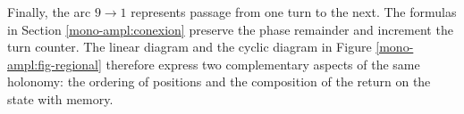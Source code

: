 Finally, the arc \(9\to1\) represents passage from one turn to the
next. The formulas in Section \ref{mono-ampl:conexion} preserve the
phase remainder and increment the turn counter. The linear diagram and
the cyclic diagram in Figure \ref{mono-ampl:fig-regional} therefore
express two complementary aspects of the same holonomy: the ordering of
positions and the composition of the return on the state with memory.
